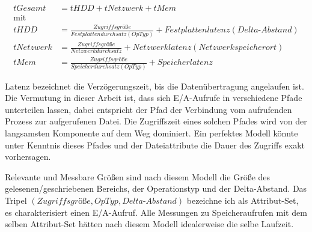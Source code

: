 \documentclass[
	12pt,
	a4paper,
	BCOR10mm,
	DIV14,
	listof=totoc,
	bibliography=totoc,
	headsepline
]{scrreprt}
\begin{document}
\begin{align*}
tGesamt &= tHDD + tNetzwerk + tMem\\
\text{mit}\\
tHDD &= \frac{Zugriffsgrö\text{ß}e}{Festplattendurchsatz(OpTyp)} + Festplattenlatenz(Delta\text{-}Abstand) \\
tNetzwerk &= \frac{Zugriffsgrö\text{ß}e}{Netzwerkdurchsatz} + Netzwerklatenz(Netzwerkspeicherort) \\
tMem &= \frac{Zugriffsgrö\text{ß}e}{Speicherdurchsatz(OpTyp)} + Speicherlatenz
\end{align*}

Latenz bezeichnet die Verzögerungszeit, bis die Datenübertragung angelaufen ist.
Die Vermutung in dieser Arbeit ist, dass sich E/A-Aufrufe in verschiedene Pfade unterteilen lassen, dabei entspricht der Pfad der Verbindung vom aufrufenden Prozess zur aufgerufenen Datei. Die Zugriffszeit eines solchen Pfades wird von der langsamsten Komponente auf dem Weg dominiert. 
Ein perfektes Modell könnte unter Kenntnis dieses Pfades und der Dateiattribute die Dauer des Zugriffs exakt vorhersagen.

Relevante und Messbare Größen sind nach diesem Modell die Größe des gelesenen/geschriebenen Bereichs, der Operationstyp und der Delta-Abstand. 
Das Tripel $(Zugriffsgrö\text{ß}e,OpTyp,Delta\text{-}Abstand)$ bezeichne ich als Attribut-Set, es charakterisiert einen E/A-Aufruf. Alle Messungen zu Speicheraufrufen mit dem selben Attribut-Set hätten nach diesem Modell idealerweise die selbe Laufzeit. 
\end{document}
